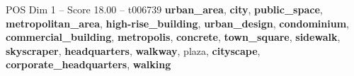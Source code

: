 \begin{textsample}{POS Dim 1 – Score 18.00 – t006739}  \label{ex:f1_pos_030}
\textbf{urban\_area}, \textbf{city}, \textbf{public\_space}, \textbf{metropolitan\_area}, \textbf{high-rise\_building}, \textbf{urban\_design}, \textbf{condominium}, \textbf{commercial\_building}, \textbf{metropolis}, \textbf{concrete}, \textbf{town\_square}, \textbf{sidewalk}, \textbf{skyscraper}, \textbf{headquarters}, \textbf{walkway}, plaza, \textbf{cityscape}, \textbf{corporate\_headquarters}, \textbf{walking}

\end{textsample}
